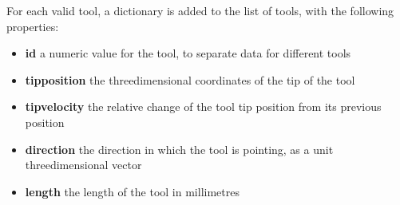 For each valid tool, a dictionary is added to the list of tools, with the following
properties:
\begin{itemize}
\item\textbf{id} \longDash{} a numeric value for the tool, to separate data for different
tools
\item\exSp\textbf{tipposition} \longDash{} the three\longDash{}dimensional coordinates of
the tip of the tool
\item\exSp\textbf{tipvelocity} \longDash{} the relative change of the tool tip position
from its previous position
\item\exSp\textbf{direction} \longDash{} the direction in which the tool is pointing, as a
unit three\longDash{}dimensional vector
\item\exSp\textbf{length} \longDash{} the length of the tool in millimetres
\end{itemize}
\appendixEnd{}
